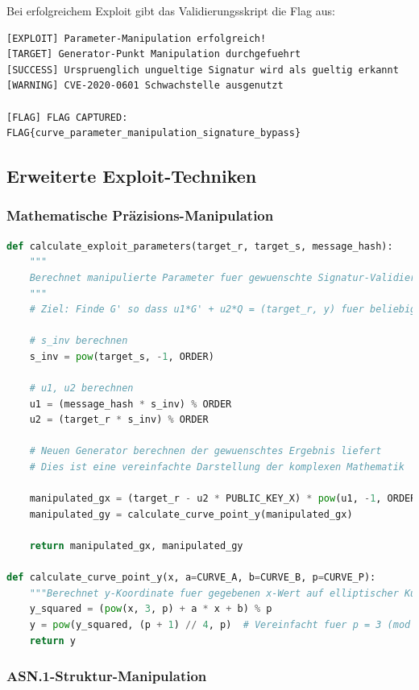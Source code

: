 \documentclass{article}
\begin{document}
Bei erfolgreichem Exploit gibt das Validierungsskript die Flag aus:

\begin{lstlisting}[caption=Erfolgreicher Exploit]
[EXPLOIT] Parameter-Manipulation erfolgreich!
[TARGET] Generator-Punkt Manipulation durchgefuehrt
[SUCCESS] Urspruenglich ungueltige Signatur wird als gueltig erkannt
[WARNING] CVE-2020-0601 Schwachstelle ausgenutzt

[FLAG] FLAG CAPTURED:
FLAG{curve_parameter_manipulation_signature_bypass}
\end{lstlisting}

\subsection{Erweiterte Exploit-Techniken}

\subsubsection{Mathematische Präzisions-Manipulation}

\begin{lstlisting}[language=python, caption=Praezise Parameter-Berechnung]
def calculate_exploit_parameters(target_r, target_s, message_hash):
    """
    Berechnet manipulierte Parameter fuer gewuenschte Signatur-Validierung
    """
    # Ziel: Finde G' so dass u1*G' + u2*Q = (target_r, y) fuer beliebiges y
    
    # s_inv berechnen
    s_inv = pow(target_s, -1, ORDER)
    
    # u1, u2 berechnen  
    u1 = (message_hash * s_inv) % ORDER
    u2 = (target_r * s_inv) % ORDER
    
    # Neuen Generator berechnen der gewuenschtes Ergebnis liefert
    # Dies ist eine vereinfachte Darstellung der komplexen Mathematik
    
    manipulated_gx = (target_r - u2 * PUBLIC_KEY_X) * pow(u1, -1, ORDER) % ORDER
    manipulated_gy = calculate_curve_point_y(manipulated_gx)
    
    return manipulated_gx, manipulated_gy

def calculate_curve_point_y(x, a=CURVE_A, b=CURVE_B, p=CURVE_P):
    """Berechnet y-Koordinate fuer gegebenen x-Wert auf elliptischer Kurve"""
    y_squared = (pow(x, 3, p) + a * x + b) % p
    y = pow(y_squared, (p + 1) // 4, p)  # Vereinfacht fuer p = 3 (mod 4)
    return y
\end{lstlisting}

\subsubsection{ASN.1-Struktur-Manipulation}
\end{document}
